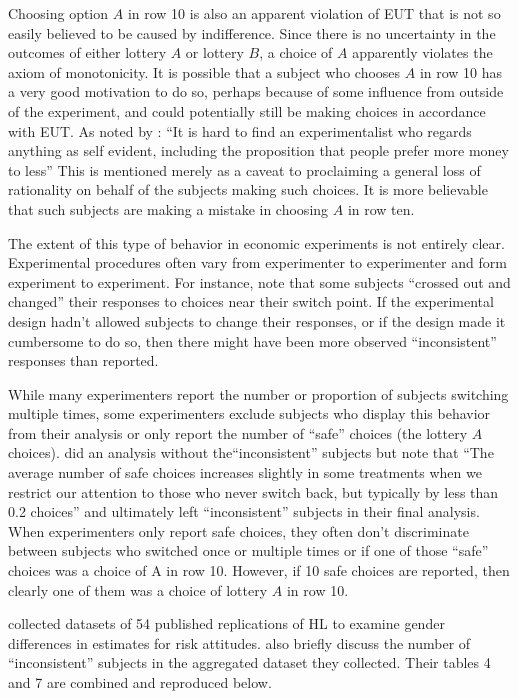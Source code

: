 \documentclass[../main.tex]{subfiles}
\begin{document}
Choosing option $A$ in row 10 is also an apparent violation of EUT that is not so easily believed to be caused by indifference.
Since there is no uncertainty in the outcomes of either lottery $A$ or lottery $B$, a choice of $A$ apparently violates the axiom of monotonicity.
It is possible that a subject who chooses $A$ in row 10 has a very good motivation to do so, perhaps because of some influence from outside of the experiment, and could potentially still be making choices in accordance with EUT.
As noted by \textcite[930]{Smith1982}: \enquote{It is hard to find an experimentalist who regards anything as self evident, including the proposition that people prefer more money to less}
This is mentioned merely as a caveat to proclaiming a general loss of rationality on behalf of the subjects making such choices. It is more believable that such subjects are making a mistake in choosing $A$ in row ten.

The extent of this type of behavior in economic experiments is not entirely clear.
Experimental procedures often vary from experimenter to experimenter and form experiment to experiment.
For instance, \textcite{Holt2002} note that some subjects \enquote{crossed out and changed} their responses to choices near their switch point.
If the experimental design hadn't allowed subjects to change their responses, or if the design made it cumbersome to do so, then there might have been more observed \enquote{inconsistent} responses than reported. 

While many experimenters report the number or proportion of subjects switching multiple times, some experimenters exclude subjects who display this behavior from their analysis or only report the number of \enquote{safe} choices (the lottery $A$ choices).
\textcite[1648]{Holt2002} did an analysis without the\enquote{inconsistent} subjects but note that \enquote{The average number of safe choices increases slightly in some treatments when we restrict our attention to those who never switch back, but typically by less than 0.2 choices} and ultimately left \enquote{inconsistent} subjects in their final analysis.
When experimenters only report safe choices, they often don't discriminate between subjects who switched once or multiple times or if one of those \enquote{safe} choices was a choice of A in row 10.
However, if 10 safe choices are reported, then clearly one of them was a choice of lottery $A$ in row 10.

\textcite[9]{Filippin2014} collected datasets of 54 published replications of HL to examine gender differences in estimates for risk attitudes.
\textcite[10-11, 17-18]{Filippin2014} also briefly discuss the number of \enquote{inconsistent} subjects in the aggregated dataset they collected.
Their tables 4 and 7 are combined and reproduced below.
\end{document}
